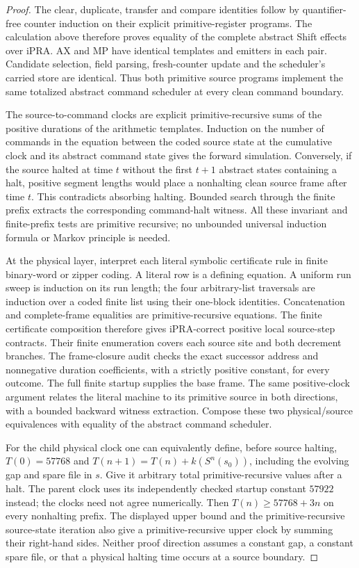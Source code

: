 \begin{proof}
The clear, duplicate, transfer and compare identities follow by
quantifier-free counter induction on their explicit primitive-register
programs.  The calculation above therefore proves equality of the
complete abstract Shift effects over iPRA.  AX and MP have identical
templates and emitters in each pair.  Candidate selection, field parsing,
fresh-counter update and the scheduler's carried store are identical.
Thus both primitive source programs implement the same totalized
abstract command scheduler at every clean command boundary.

The source-to-command clocks are explicit primitive-recursive sums of
the positive durations of the arithmetic templates.  Induction on the
number of commands in the equation between the coded source state at
the cumulative clock and its abstract command state gives the forward
simulation.  Conversely, if the source halted at time $t$ without the
first $t+1$ abstract states containing a halt, positive segment lengths
would place a nonhalting clean source frame after time $t$.  This
contradicts absorbing halting.  Bounded search through the finite prefix
extracts the corresponding command-halt witness.  All these invariant
and finite-prefix tests are primitive recursive; no unbounded universal
induction formula or Markov principle is needed.

At the physical layer, interpret each literal symbolic certificate rule
in finite binary-word or zipper coding.  A literal row is a defining
equation.  A uniform run sweep is induction on its run length; the
four arbitrary-list traversals are induction over a coded finite list
using their one-block identities.  Concatenation and complete-frame
equalities are primitive-recursive equations.  The finite certificate
composition therefore gives iPRA-correct positive local source-step
contracts.  Their finite enumeration covers each source site and both
decrement branches.  The frame-closure audit checks the exact successor
address and nonnegative duration coefficients, with a strictly positive
constant, for every outcome.  The full finite startup supplies the base
frame.  The same positive-clock argument relates the literal machine
to its primitive source in both directions, with a bounded backward
witness extraction.  Compose these two physical/source equivalences
with equality of the abstract command scheduler.

For the child physical clock one can equivalently define, before source
halting, $T(0)=57768$ and
$T(n+1)=T(n)+k(S^n(s_0))$, including the evolving gap and spare file
in $s$.  Give it arbitrary total primitive-recursive values after a
halt.  The parent clock uses its independently checked startup constant
$57922$ instead; the clocks need not agree numerically.  Then $T(n)\ge57768+3n$ on every nonhalting prefix.  The displayed
upper bound and the primitive-recursive source-state iteration also
give a primitive-recursive upper clock by summing their right-hand
sides.  Neither proof direction assumes a constant gap, a constant
spare file, or that a physical halting time occurs at a source boundary.
\end{proof}

